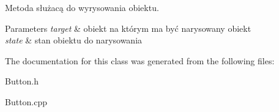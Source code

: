 Metoda służacą do wyrysowania obiektu. 


\begin{DoxyParams}{Parameters}
{\em target} & obiekt na którym ma być narysowany obiekt \\
\hline
{\em state} & stan obiektu do narysowania \\
\hline
\end{DoxyParams}


The documentation for this class was generated from the following files\+:\begin{DoxyCompactItemize}
\item 
Button.\+h\item 
Button.\+cpp\end{DoxyCompactItemize}
